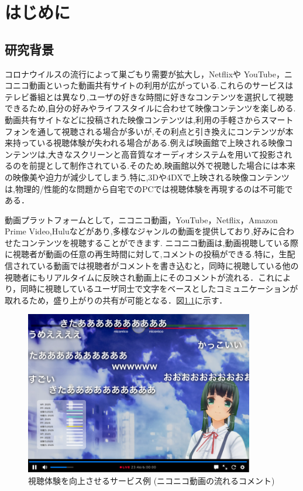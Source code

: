 \chapter{はじめに}
\thispagestyle{myheadings}

\section{研究背景}
コロナウイルスの流行によって巣ごもり需要が拡大し，Netflixや YouTube，ニコニコ動画といった動画共有サイトの利用が広がっている.これらのサービスはテレビ番組とは異なり,ユーザの好きな時間に好きなコンテンツを選択して視聴できるため,自分の好みやライフスタイルに合わせて映像コンテンツを楽しめる.動画共有サイトなどに投稿された映像コンテンツは,利用の手軽さからスマートフォンを通して視聴される場合が多いが,その利点と引き換えにコンテンツが本来持っている視聴体験が失われる場合がある.例えば映画館で上映される映像コンテンツは,大きなスクリーンと高音質なオーディオシステムを用いて投影されるのを前提として制作されている.そのため,映画館以外で視聴した場合には本来の映像美や迫力が減少してしまう.特に,3Dや4DXで上映される映像コンテンツは,物理的/性能的な問題から自宅でのPCでは視聴体験を再現するのは不可能である．

動画プラットフォームとして，ニコニコ動画，YouTube，Netflix，Amazon Prime Video,Huluなどがあり,多様なジャンルの動画を提供しており,好みに合わせたコンテンツを視聴することができます.
ニコニコ動画は,動画視聴している際に視聴者が動画の任意の再生時間に対して,コメントの投稿ができる.特に，生配信されている動画では視聴者がコメントを書き込むと，同時に視聴している他の視聴者にもリアルタイムに反映され動画上にそのコメントが流れる．これにより，同時に視聴しているユーザ同士で文字をベースとしたコミュニケーションが取れるため，盛り上がりの共有が可能となる．図\ref{nikoniko}に示す．
\begin{figure}[H]
    \centering
    \includegraphics[width=10cm]{images/chapter1/nikoniko_grafu.png}
    \caption{視聴体験を向上させるサービス例 (ニコニコ動画の流れるコメント)}
    \label{nikoniko}
\end{figure}

